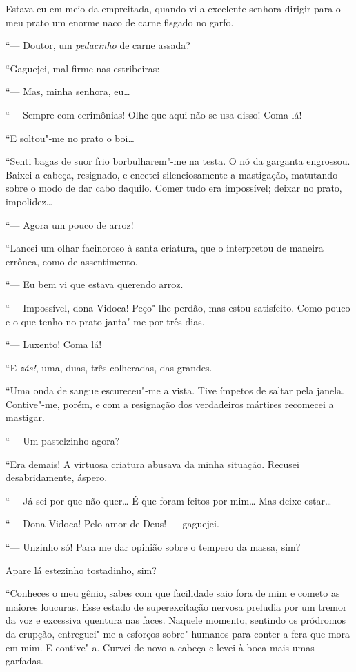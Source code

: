 Estava eu em meio da empreitada, quando vi a excelente senhora dirigir
para o meu prato um enorme naco de carne fisgado no garfo.

``--- Doutor, um \emph{pedacinho} de carne assada?

``Gaguejei, mal firme nas estribeiras:

``--- Mas, minha senhora, eu\ldots{}

``--- Sempre com cerimônias! Olhe que aqui não se usa disso! Coma lá!

``E soltou"-me no prato o boi\ldots{}

``Senti bagas de suor frio borbulharem"-me na testa. O nó da garganta
engrossou. Baixei a cabeça, resignado, e encetei silenciosamente a
mastigação, matutando sobre o modo de dar cabo daquilo. Comer tudo era
impossível; deixar no prato, impolidez\ldots{}

``--- Agora um pouco de arroz!

``Lancei um olhar facinoroso à santa criatura, que o interpretou de
maneira errônea, como de assentimento.

``--- Eu bem vi que estava querendo arroz.

``--- Impossível, dona Vidoca! Peço"-lhe perdão, mas estou satisfeito.
Como pouco e o que tenho no prato janta"-me por três dias.

``--- Luxento! Coma lá!

``E \emph{zás!}, uma, duas, três colheradas, das grandes.

``Uma onda de sangue escureceu"-me a vista. Tive ímpetos de saltar pela
janela. Contive"-me, porém, e com a resignação dos verdadeiros mártires
recomecei a mastigar.

``--- Um pastelzinho agora?

``Era demais! A virtuosa criatura abusava da minha situação. Recusei
desabridamente, áspero.

``--- Já sei por que não quer\ldots{} É que foram feitos por mim\ldots{} Mas deixe
estar\ldots{}

``--- Dona Vidoca! Pelo amor de Deus! --- gaguejei.

``--- Unzinho só! Para me dar opinião sobre o tempero da massa, sim?

Apare lá estezinho tostadinho, sim?

``Conheces o meu gênio, sabes com que facilidade saio fora de mim e
cometo as maiores loucuras. Esse estado de superexcitação nervosa
preludia por um tremor da voz e excessiva quentura nas faces. Naquele
momento, sentindo os pródromos da erupção, entreguei"-me a esforços
sobre"-humanos para conter a fera que mora em mim. E contive"-a. Curvei de
novo a cabeça e levei à boca mais umas garfadas.

